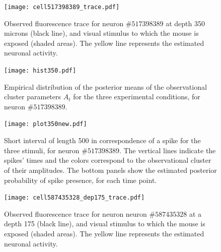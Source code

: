 \begin{figure}
	\centerline{\texttt{[image: cell517398389\_trace.pdf]}}
	\caption[Observed fluorescence trace of neuron $\#517398389$ from the Allen Brain Observatory data and estimated neuronal activity.]{Observed fluorescence trace for neuron $\#517398389$ at depth 350 microns (black line), and visual stimulus to which the mouse is exposed (shaded areas). The yellow line represents the estimated neuronal activity.}
	\label{fig:cell1_trace}
\end{figure}
\begin{figure}
	\centering
	\begin{minipage}{0.45\textwidth}
		\centering
		\texttt{[image: hist350.pdf]}
		\caption[Distribution of the observational cluster parameters for the three experimental conditions of neuron $\#517398389$.]{Empirical distribution of the posterior means of the observational cluster parameters $A_t$ for the three experimental conditions, for neuron $\#517398389$.}
		\label{fig:A_distr1}
	\end{minipage}\hfill
	\begin{minipage}{0.45\textwidth}
		\centering
		\texttt{[image: plot350new.pdf]}
		\caption[Visual representation of the estimated spikes and their amplitudes in the calcium trace of neuron $\#517398389$.]{Short interval of length 500 in correspondence of a spike for the three stimuli, for neuron $\#517398389$. The vertical lines indicate the spikes' times and the colors correspond to the observational cluster of their amplitudes. The bottom panels show the estimated posterior probability of spike presence, for each time point.}
		\label{fig:spike_color1}
	\end{minipage}
\end{figure}






\newpage
\begin{figure}
	\centerline{\texttt{[image: cell587435328\_dep175\_trace.pdf]}}
	\caption[Observed fluorescence trace of neuron $\#587435328$ from the Allen Brain Observatory data and estimated neuronal activity.]{Observed fluorescence trace for neuron neuron $\#587435328$ at a depth 175 (black line), and visual stimulus to which the mouse is exposed (shaded areas). The yellow line represents the estimated neuronal activity.}
	\label{fig:cell2_trace}
\end{figure}

